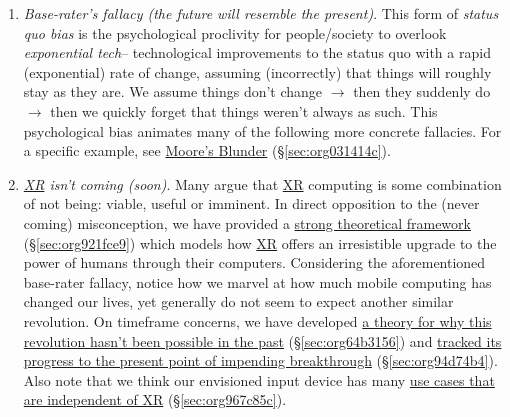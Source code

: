 \documentclass[logo,bsc,singlespacing,parskip]{infthesis}
\begin{document}
\begin{enumerate}
\item \emph{Base-rater's fallacy (the future will resemble the present)}.
This form of \emph{status quo bias} is the psychological proclivity for people/society to overlook \emph{exponential tech}-- technological improvements to the status quo with a rapid (exponential) rate of change, assuming (incorrectly) that things will roughly stay as they are.
We assume things don't change \(\rightarrow\) then they suddenly do \(\rightarrow\) then we quickly forget that things weren't always as such.
This psychological bias animates many of the following more concrete fallacies.
For a specific example, see \hyperref[sec:org031414c]{Moore's Blunder} (\S \ref{sec:org031414c}).

\item \emph{\hyperref[org1d567af]{XR} isn't coming (soon)}.
Many argue that \hyperref[org1d567af]{XR} computing is some combination of not being: viable, useful or imminent.
In direct opposition to the (never coming) misconception, we have provided a \hyperref[sec:org921fce9]{strong theoretical framework} (\S \ref{sec:org921fce9}) which models how \hyperref[org1d567af]{XR} offers an irresistible upgrade to the power of humans through their computers.
Considering the aforementioned base-rater fallacy, notice how we marvel at how much mobile computing has changed our lives, yet generally do not seem to expect another similar revolution.
On timeframe concerns, we have developed \hyperref[sec:org64b3156]{a theory for why this revolution hasn't been possible in the past} (\S \ref{sec:org64b3156}) and \hyperref[sec:org94d74b4]{tracked its progress to the present point of impending breakthrough} (\S \ref{sec:org94d74b4}).
Also note that we think our envisioned input device has many \hyperref[sec:org967c85c]{use cases that are independent of XR} (\S \ref{sec:org967c85c}).


\end{enumerate}
\end{document}
